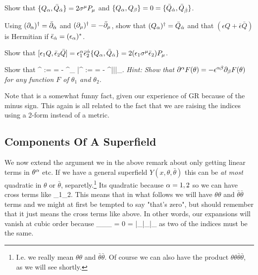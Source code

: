 \bbox 
    \ben 
        \item Show that $\{Q_{\alpha},\bar{Q}_{\dot{\alpha}}\} = 2\sigma^{\mu}P_{\mu}$ and $\{Q_{\alpha},Q_{\beta}\}=0=\{\bar{Q}_{\dot{\alpha}},\bar{Q}_{\dot{\beta}} \}$. 
        \item Using $(\partial_{\alpha})^{\dagger} = \bar{\partial}_{\dot{\alpha}}$ and $(\partial_{\mu})^{\dagger} = -\bar{\partial}_{\mu}$, show that $(Q_{\alpha})^{\dagger}= \bar{Q}_{\dot{\alpha}}$ and that $(\epsilon Q + \bar{\epsilon}\bar{Q})$ is Hermitian if $\bar{\epsilon}_{\dot{\alpha}} = (\epsilon_{\alpha})^*$. 
        \item Show that $[\epsilon_1 Q, \bar{\epsilon}_2\bar{Q}] = \epsilon_1^{\alpha}\bar{\epsilon}_2^{\dot{\alpha}} \{ Q_{\alpha} ,\bar{Q}_{\dot{\alpha}}\} = 2(\epsilon_1 \sigma^{\mu} \bar{\epsilon}_2) P_{\mu}$. 
        \item Show that 
        \be 
        \label{eqn:RaisingIndexOnAlphaDerivative}
            \p^{\a} := \frac{\p}{\p \theta_{\a}} = - \epsilon^{\a\beta}\p_{\beta} \qand \bar{\p}^{\dot{\a}} := \frac{\p}{\p \bar{\theta}_{\a}} = - \epsilon^{\bar{\a}\bar{\beta}}\bar{\p}_{\dot{\beta}}.
        \ee 
        \textit{Hint: Show that $\partial^{\alpha}F(\theta) = - \epsilon^{\alpha\beta}\partial_{\beta}F(\theta)$ for any function $F$ of $\theta_1$ and $\theta_2$.}
    \een 
\ebox 

\br 
    Note that  is a somewhat funny fact, given our experience of GR because of the minus sign. This again is all related to the fact that we are raising the indices using a 2-form instead of a metric. 
\er 

\subsection{Components Of A Superfield}

We now extend the argument we in the above remark about only getting linear terms in $\theta^{\alpha}$ etc. If we have a general superfield $Y(x,\theta,\bar{\theta})$ this can be \textit{at most} quadratic in $\theta$ or $\bar{\theta}$, separetly.\footnote{I.e. we really mean $\theta\theta$ and $\bar{\theta}\bar{\theta}$. Of course we can also have the product $\theta\theta\bar{\theta}\bar{\theta}$, as we will see shortly.} Its quadratic because $\alpha=1,2$ so we can have cross terms like
\bse 
    \theta_1\theta_2.
\ese
This means that in what follows we will have $\theta\theta$ and $\bar{\theta}\bar{\theta}$ terms and we might at first be tempted to say "that's zero", but should remember that it just means the cross terms like above. In other words, our expansions will vanish at cubic order because 
\bse 
    \theta_{\a}\theta_{\beta}\theta_{\g} = 0 = \bar{\theta}_{\dot{\a}}\bar{\theta}_{\dot{\beta}}\bar{\theta}_{\dot{\g}} 
\ese 
as two of the indices must be the same.

